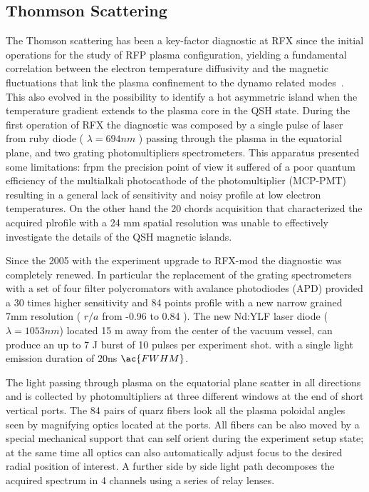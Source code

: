 \subsection{Thonmson Scattering}
The Thomson scattering  has been a key-factor diagnostic at RFX since the initial operations for the study of RFP plasma configuration, yielding a fundamental correlation between the electron temperature diffusivity and the magnetic fluctuations that link the plasma confinement to the dynamo related modes~\cite{}. This also evolved in the possibility to identify a hot asymmetric island when the temperature gradient extends to the plasma core in the \ac{QSH} state.
During the first operation of RFX the diagnostic was composed by a single pulse of laser from ruby diode ( $\lambda = 694 nm$ ) passing through the plasma in the equatorial plane, and two grating photomultipliers spectrometers.
This apparatus presented some limitations: frpm the precision point of view it suffered of a poor quantum efficiency of the multialkali photocathode of the photomultiplier (MCP-PMT) resulting in a general lack of sensitivity and noisy profile at low electron temperatures. On the other hand the 20 chords acquisition that characterized the acquired plrofile with a 24 mm spatial resolution was unable to effectively investigate the details of the QSH magnetic islands.

Since the 2005 with the experiment upgrade to RFX-mod the diagnostic was completely renewed. In particular the replacement of the grating spectrometers with a set of four filter polycromators with avalance photodiodes (APD) provided a 30 times higher sensitivity and 84 points profile with a new narrow grained 7mm resolution ( $r/a$ from -0.96 to 0.84 ).
The new Nd:YLF laser diode ($\lambda=1053 nm$) located 15 m away from the center of the vacuum vessel, can produce an up to 7 J burst of 10 pulses per experiment shot. with a single light emission duration of 20ns $\ac{FWHM}$.

The light passing through plasma on the equatorial plane scatter in all directions and is collected by photomultipliers at three different windows at the end of short vertical ports. The 84 pairs of quarz fibers look all the plasma poloidal angles seen by magnifying optics located at the ports. All fibers can be also moved by a special mechanical support that can self orient during the experiment setup state; at the same time all optics can also automatically adjust focus to the desired radial position of interest.
A further side by side light path decomposes the acquired spectrum in 4 channels using a series of relay lenses.

